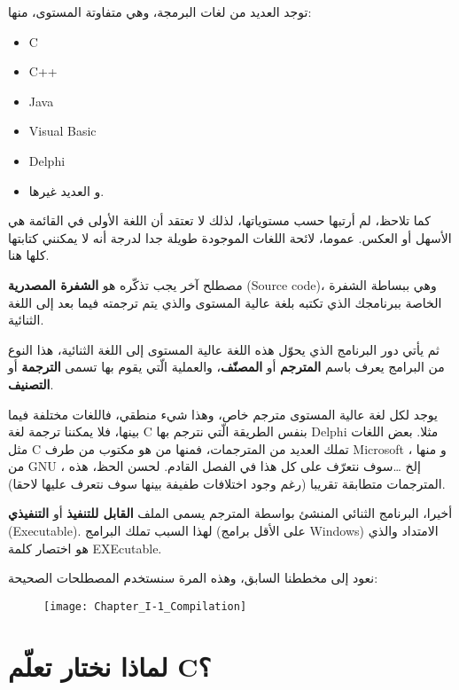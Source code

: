 توجد العديد من لغات البرمجة، وهي متفاوتة المستوى، منها:
\begin{itemize}
  \item \textenglish{C}
  \item \textenglish{C++}
  \item \textenglish{Java}
  \item \textenglish{Visual Basic}
  \item \textenglish{Delphi}
  \item و العديد غيرها.
\end{itemize}

كما تلاحظ، لم أرتبها حسب مستوياتها، لذلك لا تعتقد أن اللغة الأولى في القائمة هي الأسهل أو العكس. عموما، لائحة اللغات الموجودة طويلة جدا لدرجة أنه لا يمكنني كتابتها كلها هنا.

مصطلح آخر يجب تذكّره هو
\textbf{الشفرة المصدرية}
(\textenglish{Source code})،
 وهي ببساطة الشفرة الخاصة ببرنامجك الذي تكتبه بلغة عالية المستوى والذي يتم ترجمته فيما بعد إلى اللغة الثنائية.

 ثم يأتي دور البرنامج الذي يحوّل هذه اللغة عالية المستوى إلى اللغة الثنائية، هذا النوع من البرامج يعرف باسم
 \textbf{المترجم}
  أو
  \textbf{المصنّف}،
 والعملية الّتي يقوم بها تسمى
 \textbf{الترجمة}
 أو
 \textbf{التصنيف}.

\begin{information}
  يوجد لكل لغة عالية المستوى مترجم خاص، وهذا شيء منطقي، فاللغات مختلفة فيما بينها، فلا يمكننا ترجمة لغة
\textenglish{C}
بنفس الطريقة الّتي نترجم بها
\textenglish{Delphi}
مثلا.
  بعض اللغات مثل
\textenglish{C}
تملك العديد من المترجمات، فمنها من هو مكتوب من طرف
\textenglish{Microsoft}
، و منها من
\textenglish{GNU}
، إلخ \dots سوف نتعرّف على كل هذا في الفصل القادم.
  لحسن الحظ، هذه المترجمات متطابقة تقريبا (رغم وجود اختلافات طفيفة بينها سوف نتعرف عليها لاحقا).
\end{information}

أخيرا، البرنامج الثنائي المنشئ بواسطة المترجم يسمى الملف
\textbf{القابل للتنفيذ}
أو
\textbf{التنفيذي}
(\textenglish{Executable}).
 لهذا السبب تملك البرامج
 (على الأقل برامج
 \textenglish{Windows})
 الامتداد
 والذي هو اختصار كلمة
 \textenglish{EXEcutable}.

 نعود إلى مخططنا السابق، وهذه المرة سنستخدم المصطلحات الصحيحة:

\begin{figure}[H]
	\centering
	\texttt{[image: Chapter\_I-1\_Compilation]}
\end{figure}

 \section{لماذا نختار تعلّم \textenglish{C}؟}
 
